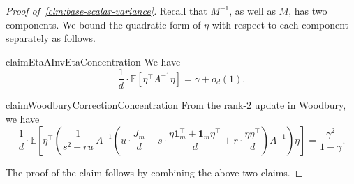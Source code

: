 \documentclass[12pt]{article}
\def \E {\mathbb{E}}
\def\1{\bm{1}}
\newcommand{\gam}{\gamma}
\begin{document}
\begin{proof}[Proof of~\cref{clm:base-scalar-variance}]
	
Recall that $M^{-1}$, as well as $M$, has two components. We bound the quadratic form of $\eta$ with respect to each component separately as follows.

 \begin{restatable}{claim}{EtaAInvEtaConcentration} 
\label{clm:concentration-eta-A-eta}
We have
\[
    \frac{1}{d}\cdot \E\!\left[\eta^\top A^{-1}\eta\right]
    =
    \gamma + o_d(1).
\]
\end{restatable}
 
\begin{restatable}{claim}{WoodburyCorrectionConcentration} From the rank-$2$ update in Woodbury, 
\label{clm:concentration-woodbury}
we have
\[
\frac{1}{d} \cdot
\E\!\left[
\eta^\top
\left(
\frac{1}{s^2-ru}\,
A^{-1}
\left(
u\cdot \frac{J_m}{d}
-
s\cdot \frac{\eta \mathbf 1_m^\top+\mathbf 1_m \eta^\top}{d}
+
r\cdot \frac{\eta\eta^\top}{d}
\right)
A^{-1}
\right)
\eta
\right]
=
\frac{\gamma^2}{1-\gamma}.
\]

\end{restatable}
The proof of the claim follows by combining the above two claims.

\end{proof}
\end{document}
